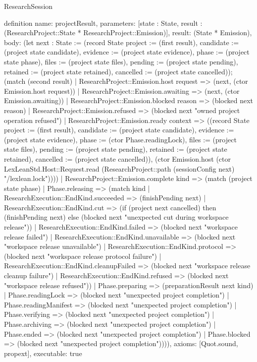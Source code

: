 \begin{lexlean}{ResearchSession}
\begin{semanticmodule}
definition{
 name: projectResult,
 parameters: [state : State, result : (ResearchProject::State * ResearchProject::Emission)],
 result: (State * Emission),
 body: (let next : State := (record State {project := (first result), candidate := (project state candidate), evidence := (project state evidence), phase := (project state phase), files := (project state files), pending := (project state pending), retained := (project state retained), cancelled := (project state cancelled)}); (match (second result) | ResearchProject::Emission.host request => (next, (ctor Emission.host request)) | ResearchProject::Emission.awaiting => (next, (ctor Emission.awaiting)) | ResearchProject::Emission.blocked reason => (blocked next reason) | ResearchProject::Emission.refused => (blocked next "owned project operation refused") | ResearchProject::Emission.ready context => ((record State {project := (first result), candidate := (project state candidate), evidence := (project state evidence), phase := (ctor Phase.readingLock), files := (project state files), pending := (project state pending), retained := (project state retained), cancelled := (project state cancelled)}), (ctor Emission.host (ctor LexLeanStd.Host::Request.read (ResearchProject::path (sessionConfig next) "/lexlean.lock")))) | ResearchProject::Emission.complete kind => (match (project state phase) | Phase.releasing => (match kind | ResearchExecution::EndKind.succeeded => (finishPending next) | ResearchExecution::EndKind.cut => (if (project next cancelled) then (finishPending next) else (blocked next "unexpected cut during workspace release")) | ResearchExecution::EndKind.failed => (blocked next "workspace release failed") | ResearchExecution::EndKind.unavailable => (blocked next "workspace release unavailable") | ResearchExecution::EndKind.protocol => (blocked next "workspace release protocol failure") | ResearchExecution::EndKind.cleanupFailed => (blocked next "workspace release cleanup failure") | ResearchExecution::EndKind.refused => (blocked next "workspace release refused")) | Phase.preparing => (preparationResult next kind) | Phase.readingLock => (blocked next "unexpected project completion") | Phase.readingManifest => (blocked next "unexpected project completion") | Phase.verifying => (blocked next "unexpected project completion") | Phase.archiving => (blocked next "unexpected project completion") | Phase.ended => (blocked next "unexpected project completion") | Phase.blocked => (blocked next "unexpected project completion")))),
 axioms: [Quot.sound, propext],
 executable: true
}


\end{semanticmodule}
\end{lexlean}
